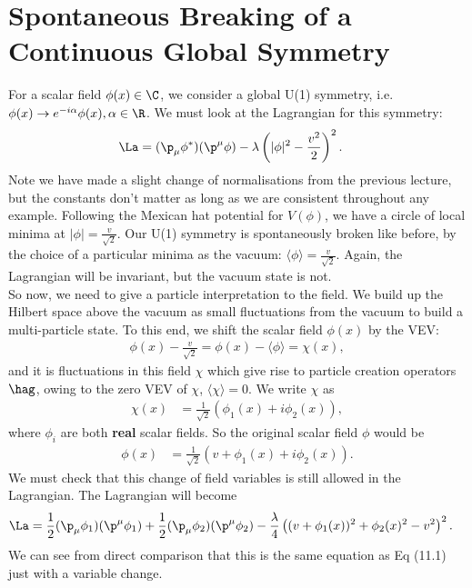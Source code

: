 \documentclass[relqm.tex]{subfiles}
\begin{document}
\section{Spontaneous Breaking of a Continuous Global Symmetry}
For a scalar field $\phi(x)\in\C$, we consider a global U(1) symmetry, i.e. $\phi(x)\to e^{-i\alpha}\phi(x),\alpha\in\R$.
We must look at the Lagrangian for this symmetry:
\begin{align}
    \La &= (\p_\mu\phi^*)(\p^\mu\phi) - \lambda\left(|\phi|^2-\frac{v^2}{2}\right)^2.
\end{align}
Note we have made a slight change of normalisations from the previous lecture, but the constants don't matter as long as we are consistent throughout any example. 
Following the Mexican hat potential for $V(\phi)$, we have a circle of local minima at $|\phi|=\frac{v}{\sqrt{2}}$.
Our U(1) symmetry is spontaneously broken like before, by the choice of a particular minima as the vacuum: $\langle\phi\rangle = \frac{v}{\sqrt{2}}$.
Again, the Lagrangian will be invariant, but the vacuum state is not.\\
So now, we need to give a particle interpretation to the field. 
We build up the Hilbert space above the vacuum as small fluctuations from the vacuum to build a multi-particle state. 
To this end, we shift the scalar field $\phi(x)$ by the VEV:
\begin{align}
    \phi(x) - \frac{v}{\sqrt{2}} = \phi(x) - \langle\phi\rangle = \chi(x),
\end{align}
and it is fluctuations in this field $\chi$ which give rise to particle creation operators $\hag$, owing to the zero VEV of $\chi$, $\langle\chi\rangle=0$.
We write $\chi$ as 
\begin{align}
    \chi(x) &= \frac{1}{\sqrt{2}}\left(\phi_1(x) + i\phi_2(x)\right),
\end{align}
where $\phi_i$ are both \textbf{real} scalar fields. 
So the original scalar field $\phi$ would be
\begin{align}
    \phi(x) &= \frac{1}{\sqrt{2}}\left(v+\phi_1(x)+i\phi_2(x)\right).
\end{align}
We must check that this change of field variables is still allowed in the Lagrangian. 
The Lagrangian will become
\begin{align}
    \La &= \frac12(\p_\mu\phi_1)(\p^\mu\phi_1) + \frac12(\p_\mu\phi_2)(\p^\mu\phi_2) - \frac{\lambda}{4}\left((v+\phi_1(x))^2+\phi_2(x)^2 - v^2\right)^2.
\end{align}
We can see from direct comparison that this is the same equation as Eq (11.1) just with a variable change. 
\end{document}
